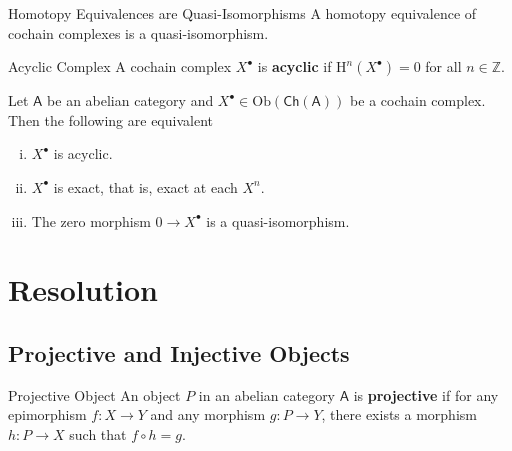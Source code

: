 \begin{corollary}{Homotopy Equivalences are Quasi-Isomorphisms}{}
    A homotopy equivalence of cochain complexes is a quasi-isomorphism.
\end{corollary}


\begin{definition}{Acyclic Complex}{}
    A cochain complex $X^{\bullet}$ is \textbf{acyclic} if $\mathrm{H}^n(X^{\bullet})=0$ for all $n\in \mathbb{Z}$.
\end{definition}


\begin{proposition}{}{}
    Let $\mathsf{A}$ be an abelian category and $X^{\bullet}\in\mathrm{Ob}\left(\mathsf{Ch}(\mathsf{A})\right)$ be a cochain complex. Then the following are equivalent
    \begin{enumerate}[(i)]
        \item $X^{\bullet}$ is acyclic.
        \item $X^{\bullet}$ is exact, that is, exact at each $X^n$.
        \item The zero morphism $0 \to X^{\bullet}$ is a quasi-isomorphism.
    \end{enumerate}
\end{proposition}

\section{Resolution}

\subsection{Projective and Injective Objects}
\begin{definition}{Projective Object}{}
    An object $P$ in an abelian category $\mathsf{A}$ is \textbf{projective} if for any epimorphism $f: X \rightarrow Y$ and any morphism $g: P \rightarrow Y$, there exists a morphism $h: P \rightarrow X$ such that $f \circ h = g$.
    \begin{center}
    \end{center}
\end{definition}


